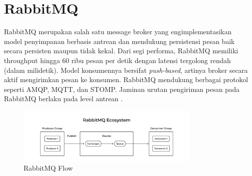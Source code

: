\section{RabbitMQ}

RabbitMQ merupakan salah satu message broker yang engimplementasikan model penyimpanan berbasis antrean dan mendukung persistensi pesan baik secara persisten maupun tidak kekal. Dari segi performa, RabbitMQ memiliki throughput hingga 60 ribu pesan per detik dengan latensi tergolong rendah (dalam milidetik). Model konsumennya bersifat \textit{push-based}, artinya broker secara aktif mengirimkan pesan ke konsumen. RabbitMQ mendukung berbagai protokol seperti AMQP, MQTT, dan STOMP. Jaminan urutan pengiriman pesan pada RabbitMQ berlaku pada level antrean \parencite{arshadChoosingTheRightMessaging}.

\begin{figure}[htbp]
    \centering
    \includegraphics[width=0.8\textwidth]{resources/chapter-2/rabbitmq.jpeg}
    \caption{RabbitMQ Flow \parencite{royNatsRmqKafka}}
    \label{fig:rabbitmq-flow}
\end{figure}
